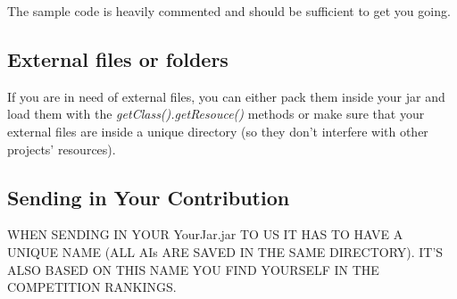 \documentclass[10pt,a4paper]{article}
\begin{document}
The sample code is heavily commented and should be sufficient to get you going.

\subsection{External files or folders}

If you are in need of external files, you can either pack them inside your jar and load them with the \textit{getClass().getResouce()} methods or make sure that your external files are inside a unique directory (so they don't interfere with other projects' resources).


\subsection{Sending in Your Contribution}


WHEN SENDING IN YOUR YourJar.jar TO US IT HAS TO HAVE A UNIQUE NAME (ALL AIs ARE SAVED IN THE SAME DIRECTORY). IT'S ALSO BASED ON THIS NAME YOU FIND YOURSELF IN THE COMPETITION RANKINGS.

\end{document}

